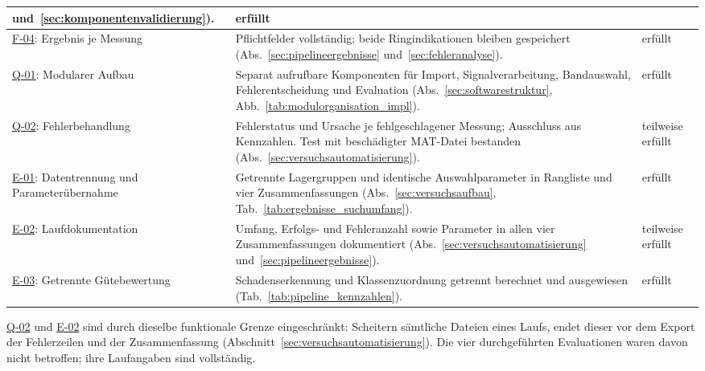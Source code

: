 \begin{longtable}{|
    >{\raggedright\arraybackslash}p{3.2cm}|
    >{\raggedright\arraybackslash}p{8.45cm}|
    >{\raggedright\arraybackslash}p{2.55cm}|}
  und~\ref{sec:komponentenvalidierung}). &
  erfüllt \\
  \hline
  \hyperlink{req:F-04}{F-04}: Ergebnis je Messung &
  Pflichtfelder vollständig; beide Ringindikationen bleiben gespeichert
  (Abs.~\ref{sec:pipelineergebnisse} und~\ref{sec:fehleranalyse}). &
  erfüllt \\
  \hline
  \hyperlink{req:Q-01}{Q-01}: Modularer Aufbau &
  Separat aufrufbare Komponenten für Import, Signalverarbeitung,
  Bandauswahl, Fehlerentscheidung und Evaluation
  (Abs.~\ref{sec:softwarestruktur}, Abb.~\ref{tab:modulorganisation_impl}). &
  erfüllt \\
  \hline
  \hyperlink{req:Q-02}{Q-02}: Fehlerbehandlung &
  Fehlerstatus und Ursache je fehlgeschlagener Messung; Ausschluss aus
  Kennzahlen. Test mit beschädigter MAT-Datei bestanden
  (Abs.~\ref{sec:versuchsautomatisierung}). &
  teilweise erfüllt \\
  \hline
  \hyperlink{req:E-01}{E-01}: Datentrennung und Parameterübernahme &
  Getrennte Lagergruppen und identische Auswahlparameter in Rangliste und
  vier Zusammenfassungen (Abs.~\ref{sec:versuchsaufbau},
  Tab.~\ref{tab:ergebnisse_suchumfang}). &
  erfüllt \\
  \hline
  \hyperlink{req:E-02}{E-02}: Laufdokumentation &
  Umfang, Erfolgs- und Fehleranzahl sowie Parameter in allen vier
  Zusammenfassungen dokumentiert
  (Abs.~\ref{sec:versuchsautomatisierung} und~\ref{sec:pipelineergebnisse}). &
  teilweise erfüllt \\
  \hline
  \hyperlink{req:E-03}{E-03}: Getrennte Gütebewertung &
  Schadenserkennung und Klassenzuordnung getrennt berechnet und ausgewiesen
  (Tab.~\ref{tab:pipeline_kennzahlen}). &
  erfüllt \\
\end{longtable}
\endgroup

\hyperlink{req:Q-02}{Q-02} und \hyperlink{req:E-02}{E-02} sind durch dieselbe funktionale Grenze eingeschränkt:
Scheitern sämtliche Dateien eines Laufs, endet dieser vor dem Export der
Fehlerzeilen und der Zusammenfassung
(Abschnitt~\ref{sec:versuchsautomatisierung}). Die vier durchgeführten
Evaluationen waren davon nicht betroffen; ihre Laufangaben sind vollständig.
